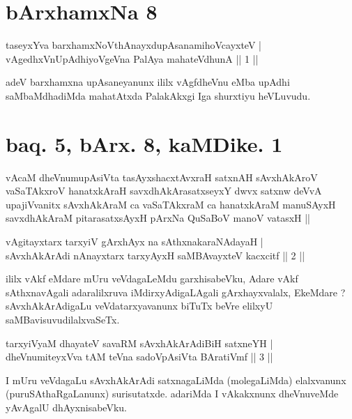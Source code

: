 \section*{bArxhamxNa 8}

\begin{shl}
taseyxYva barxhamxNoV\s thAnayxdupAsanamihoVcayxteV | \\
vAgedhxVnUpAdhiyoVgeVna PalAya mahateV\s dhunA \hfill ||  1 || 
\end{shl}

\begin{artha}
adeV barxhamxna upAsaneyanunx ililx vAgfdheVnu eMba upAdhi saMbaMdhadiMda mahatAtxda PalakAkxgi Iga shurxtiyu heVLuvudu.
\end{artha}

\section*{baq. 5, bArx. 8, kaMDike. 1}

\begin{shl}
vAcaM dheVnumupAsiVta tasAyxshacxtAvxraH satxnAH sAvxhAkAroV vaSaTAkxroV hanatxkAraH savxdhAkArasatxseyxY dwvx satxnw deVvA upajiVvanitx sAvxhAkAraM ca vaSaTAkxraM ca hanatxkAraM manuSAyxH savxdhAkAraM pitarasatxsAyxH pArxNa QuSaBoV manoV vatasxH ||
\end{shl}


\begin{shl}
vAgitayxtarx tarxyiV gArxhAyx na sAthxnakaraNAdayaH | \\
sAvxhAkArAdi nAnayxtarx tarxyAyxH saMBAvayxteV kacxcitf \hfill ||  2 || 
\end{shl}

\begin{artha}
ililx vAkf eMdare mUru veVdagaLeMdu garxhisabeVku, Adare vAkf sAthxnavAgali adaralilxruva iMdirxyAdigaLAgali gArxhayxvalalx, EkeMdare ? sAvxhAkArAdigaLu veVdatarxyavanunx biTuTx beVre elilxyU saMBavisuvudilalxvaSeTx.
\end{artha}

\begin{shl}
tarxyiVyaM dhayateV savaRM sAvxhAkArAdiBiH satxneYH | \\
dheVnumiteyxVva tAM teVna sadoVpAsiVta BAratiVmf \hfill ||  3 || 
\end{shl}

\begin{artha}
I mUru veVdagaLu sAvxhAkArAdi satxnagaLiMda (molegaLiMda) elalxvanunx (puruSAthaRgaLanunx) surisutatxde. adariMda I vAkakxnunx dheVnuveMde yAvAgalU dhAyxnisabeVku.
\end{artha}

